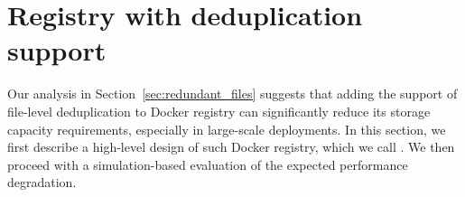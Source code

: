 \section{Registry with deduplication support}
\label{sec:file_adressable}

Our analysis in Section~\ref{sec:redundant_files} suggests that adding the
support of file-level deduplication to Docker registry can significantly reduce
its storage capacity requirements, especially in large-scale deployments.
%
In this section, we first describe a high-level design of such Docker registry,
which we call \emph{\sysname}.
%
We then proceed with a simulation-based evaluation of the expected performance
degradation.






